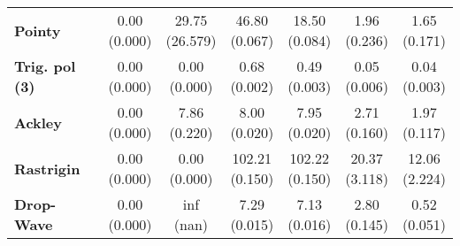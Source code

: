 \begin{table}[t]
\begin{threeparttable}
\begin{tabular}{l|cccccc}
\vspace{6pt}\textbf{Pointy} & \cellbreak[t]{0.00\\\footnotesize(0.000)} & \cellbreak[t]{29.75\\\footnotesize(26.579)} & \cellbreak[t]{46.80\\\footnotesize(0.067)} & \cellbreak[t]{18.50\\\footnotesize(0.084)} & \cellbreak[t]{1.96\\\footnotesize(0.236)} & \cellbreak[t]{1.65\\\footnotesize(0.171)}\\
\vspace{6pt}\textbf{Trig. pol (3)} & \cellbreak[t]{0.00\\\footnotesize(0.000)} & \cellbreak[t]{0.00\\\footnotesize(0.000)} & \cellbreak[t]{0.68\\\footnotesize(0.002)} & \cellbreak[t]{0.49\\\footnotesize(0.003)} & \cellbreak[t]{0.05\\\footnotesize(0.006)} & \cellbreak[t]{0.04\\\footnotesize(0.003)}\\
\vspace{6pt}\textbf{Ackley} & \cellbreak[t]{0.00\\\footnotesize(0.000)} & \cellbreak[t]{7.86\\\footnotesize(0.220)} & \cellbreak[t]{8.00\\\footnotesize(0.020)} & \cellbreak[t]{7.95\\\footnotesize(0.020)} & \cellbreak[t]{2.71\\\footnotesize(0.160)} & \cellbreak[t]{1.97\\\footnotesize(0.117)}\\
\vspace{6pt}\textbf{Rastrigin} & \cellbreak[t]{0.00\\\footnotesize(0.000)} & \cellbreak[t]{0.00\\\footnotesize(0.000)} & \cellbreak[t]{102.21\\\footnotesize(0.150)} & \cellbreak[t]{102.22\\\footnotesize(0.150)} & \cellbreak[t]{20.37\\\footnotesize(3.118)} & \cellbreak[t]{12.06\\\footnotesize(2.224)}\\
\vspace{6pt}\textbf{Drop-Wave} & \cellbreak[t]{0.00\\\footnotesize(0.000)} & \cellbreak[t]{inf\\\footnotesize(nan)} & \cellbreak[t]{7.29\\\footnotesize(0.015)} & \cellbreak[t]{7.13\\\footnotesize(0.016)} & \cellbreak[t]{2.80\\\footnotesize(0.145)} & \cellbreak[t]{0.52\\\footnotesize(0.051)}\\

\end{tabular}
\end{threeparttable}
\end{table}
